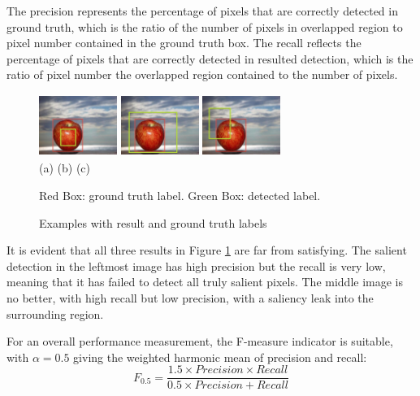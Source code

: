 \documentclass[10pt,twocolumn,letterpaper]{article}
\newcommand{\hs}{\hspace{0.58in}}
\begin{document}
The precision represents the percentage of pixels that are correctly detected in ground truth, which is the ratio of the number of pixels in overlapped region to pixel number contained in the ground truth box. The recall reflects the percentage of pixels that are correctly detected in resulted detection, which is the ratio of pixel number the overlapped region contained to the number of pixels.

\begin{figure}[h]
\begin{center}
    \includegraphics[width=1.0in,height=0.8in]{Figures/Creteria/B.jpg}
    \includegraphics[width=1.0in,height=0.8in]{Figures/Creteria/C.jpg} 
    \includegraphics[width=1.0in,height=0.8in]{Figures/Creteria/A.jpg} \\
    \footnotesize (a) \hs \hspace*{0.8cm} (b)  \hs \hspace*{0.8cm} (c)
\caption{Examples with result and ground truth labels} \label{Fig:PrecisionANDRecall}
    Red Box: ground truth label. Green Box: detected label.
\end{center} \end{figure}

It is evident that all three results in Figure \ref{Fig:PrecisionANDRecall} are far from satisfying. The salient detection in the leftmost image has high precision but the recall is very low, meaning that it has failed to detect all truly salient pixels.  The middle image is no better, with high recall but low precision, with a saliency leak into the surrounding region.

For an overall performance measurement, the F-measure indicator is suitable, with $\alpha = 0.5$ giving the weighted harmonic mean of precision and recall:$$F_{0.5} = \frac{1.5\times Precision \times Recall}{ 0.5 \times Precision + Recall}$$
\end{document}

